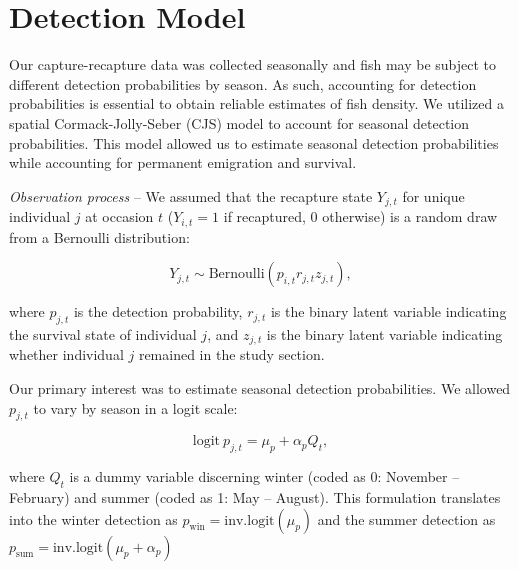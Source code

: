 \documentclass[11pt, class=article, crop=false]{standalone}
\begin{document}
\section*{Detection Model}

Our capture-recapture data was collected seasonally and fish may be subject to different detection probabilities by season.
As such, accounting for detection probabilities is essential to obtain reliable estimates of fish density.
We utilized a spatial Cormack-Jolly-Seber (CJS) model \citep{schaubEstimatingTrueInstead2014} to account for seasonal detection probabilities. 
This model allowed us to estimate seasonal detection probabilities while accounting for permanent emigration and survival.

\textit{Observation process} -- 
We assumed that the recapture state $Y_{j,t}$ for unique individual $j$ at occasion $t$ ($Y_{i,t} = 1$ if recaptured, $0$ otherwise) is a random draw from a Bernoulli distribution:

\begin{equation}
    Y_{j,t} \sim \text{Bernoulli}(p_{i,t} r_{j, t} z_{j,t}),
\end{equation}

where $p_{j,t}$ is the detection probability, $r_{j, t}$ is the binary latent variable indicating the survival state of individual $j$, and $z_{j, t}$ is the binary latent variable indicating whether individual $j$ remained in the study section.

Our primary interest was to estimate seasonal detection probabilities.
We allowed $p_{j, t}$ to vary by season in a logit scale:

\begin{equation}
    \text{logit}~p_{j,t} = \mu_p + \alpha_p Q_{t},
\end{equation}

where $Q_{t}$ is a dummy variable discerning winter (coded as 0: November -- February) and summer (coded as 1: May -- August).
This formulation translates into the winter detection as $p_{\text{win}} = \text{inv.logit}(\mu_p)$ and the summer detection as $p_{\text{sum}} = \text{inv.logit}(\mu_p + \alpha_p)$

\end{document}
